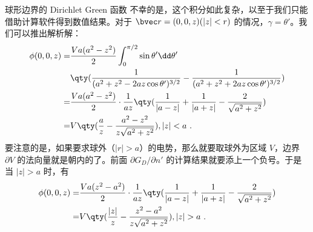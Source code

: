 \begin{example}{球形边界的 Dirichlet Green 函数}
不幸的是，这个积分如此复杂，以至于我们只能借助计算软件得到数值结果。对于 $\bvec r=(0,0,z)(|z|<r)$ 的情况，$\gamma=\theta'$。我们可以推出解析解：
\begin{equation}
\begin{aligned}
\phi(0,0,z)=&\frac{Va(a^2-z^2)}{2}\int_0^{\pi/2}\sin\theta'\dd \theta'\\
&\qty(\frac{1}{(a^2+z^2-2az\cos\theta')^{3/2}}-\frac{1}{(a^2+z^2+2az\cos\theta')^{3/2}})\\
=&\frac{Va(a^2-z^2)}{2}\cdot \frac{1}{az}\qty(\frac{1}{|a-z|}+\frac{1}{|a+z|}-\frac{2}{\sqrt{a^2+z^2}})\\
=&V\qty(\frac{a}{z}-\frac{a^2-z^2}{z\sqrt{a^2+z^2}}),    |z|<a~.
\end{aligned}
\end{equation}
要注意的是，如果要求球外（$|r|>a$）的电势，那么就要取球外为区域 $V$，边界 $\partial V$ 的法向量就是朝内的了。前面 $\partial G_D/\partial n'$ 的计算结果就要添上一个负号。于是当 $|z|>a$ 时，有 
\begin{equation}
\begin{aligned}
\phi(0,0,z)=&\frac{Va(z^2-a^2)}{2}\cdot \frac{1}{az}\qty(\frac{1}{|a-z|}+\frac{1}{|a+z|}-\frac{2}{\sqrt{a^2+z^2}})\\
=&V\qty(\frac{|z|}{z}-\frac{z^2-a^2}{z\sqrt{a^2+z^2}}),    |z|>a~.
\end{aligned}
\end{equation}
\end{example}


